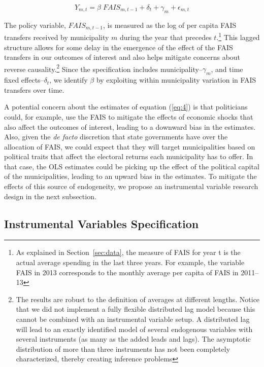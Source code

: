 \documentclass[dv_diss_main.tex]{subfiles}
\begin{document}
\begin{equation}\label{eq:4}
Y_{m,t}= \beta\; FAIS_{m,t-1}+\delta_t+\gamma_m+\epsilon_{m,t}   
\end{equation}

\noindent The policy variable, $FAIS_{m,t-1}$, is measured as the log of per capita FAIS transfers received by municipality $m$ during the year that precedes $t$.\footnote{As explained in Section~\ref{sec:data}, the measure of FAIS for year t is the actual average spending in the last three years. For example, the variable FAIS in 2013 corresponds to the monthly average per capita of FAIS in 2011–13} This lagged structure allows for some delay in the emergence of the effect of the FAIS transfers in our outcomes of interest and also helps mitigate concerns about reverse causality.\footnote{The results are robust to the definition of averages at different lengths. Notice that we did not implement a fully flexible distributed lag model because this cannot be combined with an instrumental variable setup. A distributed lag will lead to an exactly identified model of several endogenous variables with several instruments (as many as the added leads and lags). The asymptotic distribution of more than three instruments has not been completely characterized, thereby creating inference problems} Since the specification includes municipality--$\gamma_m$, and time fixed effects--$\delta_t$, we identify $\beta$ by exploiting within municipality variation in FAIS transfers over time.

A potential concern about the estimates of equation (\ref{eq:4}) is that politicians could, for example, use the FAIS to mitigate the effects of economic shocks that also affect the outcomes of interest, leading to a downward bias in the estimates. Also, given the \textit{de facto} discretion that state governments have over the allocation of FAIS, we could expect that they will target municipalities based on political traits that affect the electoral returns each municipality has to offer. In that case, the OLS estimates could be picking up the effect of the political capital of the municipalities, leading to an upward bias in the estimates. To mitigate the effects of this source of endogeneity, we propose an instrumental variable research design in the next subsection.

\subsection{Instrumental Variables Specification} \label{subsec:variables}
\end{document}
